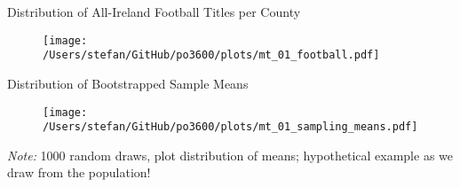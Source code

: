 \documentclass[10pt]{beamer}
\begin{document}
\begin{frame}{Distribution of All-Ireland Football Titles per County}

\begin{figure} \centering
\texttt{[image: /Users/stefan/GitHub/po3600/plots/mt\_01\_football.pdf]}
\end{figure}
\end{frame}

\begin{frame}{Distribution of Bootstrapped Sample Means}

\begin{figure} \centering
\texttt{[image: /Users/stefan/GitHub/po3600/plots/mt\_01\_sampling\_means.pdf]}
\end{figure}
\textit{Note:} 1000 random draws, plot distribution of means; hypothetical example as we draw from the population!
\end{frame}







\begin{comment}
\section{Discussion of Lecture Topics}
\begin{frame}{Central Terms and Definitions}

\begin{itemize}
\item Population
\item Sample
\item Random sample
\item Probability
\end{itemize}

\end{frame}

\begin{frame}{Central Terms and Definitions}

\begin{itemize}
\item Concept
\item Theory
\item Deduction
\item Induction
\item Levels of measurement: nominal, ordinal, interval-ratio
\end{itemize}

\end{frame}
\end{comment}
\end{document}
